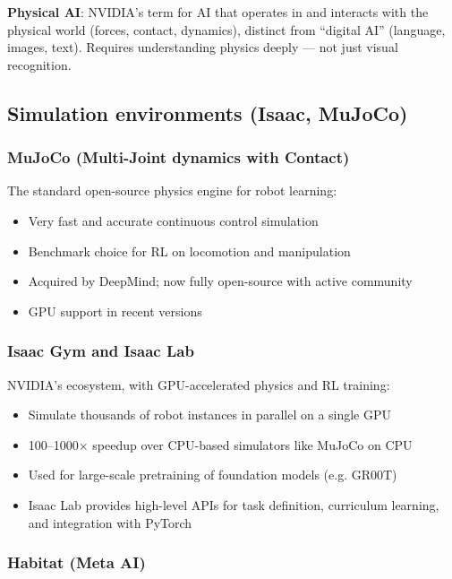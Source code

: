\begin{warnbox}
\textbf{Physical AI}: NVIDIA's term for AI that operates in and interacts with the physical world (forces, contact, dynamics), distinct from ``digital AI'' (language, images, text). Requires understanding physics deeply — not just visual recognition.
\end{warnbox}

\subsection{Simulation environments (Isaac, MuJoCo)}

\subsubsection{MuJoCo (Multi-Joint dynamics with Contact)}

The standard open-source physics engine for robot learning:
\begin{itemize}
\item Very fast and accurate continuous control simulation
\item Benchmark choice for RL on locomotion and manipulation
\item Acquired by DeepMind; now fully open-source with active community
\item GPU support in recent versions
\end{itemize}

\subsubsection{Isaac Gym and Isaac Lab}

NVIDIA's ecosystem, with GPU-accelerated physics and RL training:
\begin{itemize}
\item Simulate thousands of robot instances in parallel on a single GPU
\item 100–1000× speedup over CPU-based simulators like MuJoCo on CPU
\item Used for large-scale pretraining of foundation models (e.g. GR00T)
\item Isaac Lab provides high-level APIs for task definition, curriculum learning, and integration with PyTorch
\end{itemize}

\subsubsection{Habitat (Meta AI)}


